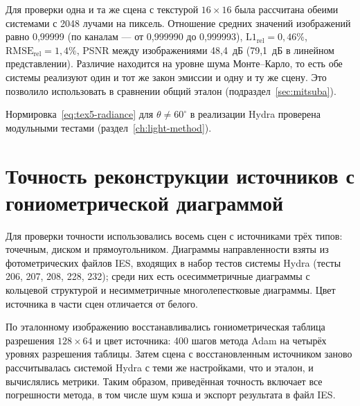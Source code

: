 Для проверки одна и та же сцена с текстурой $16\times16$ была рассчитана обеими системами с 2048 лучами на пиксель. Отношение средних значений изображений равно 0,99999 (по каналам --- от 0,999990 до 0,999993), $\mathrm{L1}_{\mathrm{rel}}=0,46\%$, $\mathrm{RMSE}_{\mathrm{rel}}=1,4\%$, PSNR между изображениями 48,4~дБ (79,1~дБ в линейном представлении). Различие находится на уровне шума Монте--Карло, то есть обе системы реализуют один и тот же закон эмиссии и одну и ту же сцену. Это позволило использовать в сравнении общий эталон (подраздел~\ref{sec:mitsuba}).

Нормировка~\eqref{eq:tex5-radiance} для $\theta\neq60^\circ$ в реализации Hydra проверена модульными тестами (раздел~\ref{ch:light-method}).

\section{Точность реконструкции источников с гониометрической диаграммой}
\label{sec:ies-accuracy}

Для проверки точности использовались восемь сцен с источниками трёх типов: точечным, диском и прямоугольником. Диаграммы направленности взяты из фотометрических файлов IES, входящих в набор тестов системы Hydra (тесты 206, 207, 208, 228, 232); среди них есть осесимметричные диаграммы с кольцевой структурой и несимметричные многолепестковые диаграммы. Цвет источника в части сцен отличается от белого.

По эталонному изображению восстанавливались гониометрическая таблица разрешения $128\times64$ и цвет источника: 400 шагов метода Adam на четырёх уровнях разрешения таблицы. Затем сцена с восстановленным источником заново рассчитывалась системой Hydra с теми же настройками, что и эталон, и вычислялись метрики. Таким образом, приведённая точность включает все погрешности метода, в том числе шум кэша и экспорт результата в файл IES.

